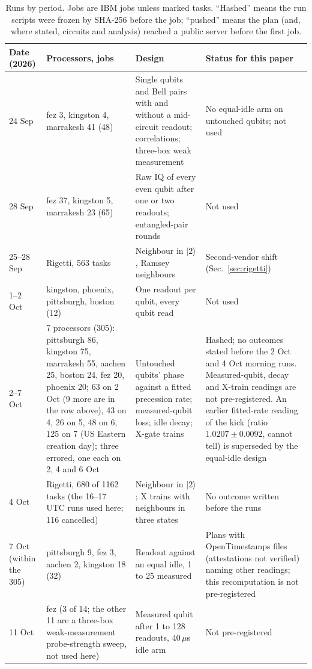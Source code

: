 \documentclass[reprint,amsmath,amssymb,aps,superscriptaddress,nofootinbib]{revtex4-2}
\newcommand{\us}{\,$\mu$s}
\begin{document}
\begin{table}[!tp]
\caption{Runs by period. Jobs are IBM jobs unless marked tasks. ``Hashed'' means the run scripts were frozen by SHA-256 before the job; ``pushed'' means the plan (and, where stated, circuits and analysis) reached a public server before the first job.}
\label{tab:runs}
\footnotesize
\begin{tabular}{p{2.3cm}p{3.6cm}p{6.3cm}p{4.9cm}}
\toprule
Date (2026) & Processors, jobs & Design & Status for this paper \\
\midrule
24 Sep & fez 3, kingston 4, marrakesh 41 (48) & Single qubits and Bell pairs with and without a mid-circuit readout; correlations; three-box weak measurement & No equal-idle arm on untouched qubits; not used \\
28 Sep & fez 37, kingston 5, marrakesh 23 (65) & Raw IQ of every even qubit after one or two readouts; entangled-pair rounds & Not used \\
25--28 Sep & Rigetti, 563 tasks & Neighbour in $|2\rangle$, Ramsey neighbours & Second-vendor shift (Sec.~\ref{sec:rigetti}) \\
1--2 Oct & kingston, phoenix, pittsburgh, boston (12) & One readout per qubit, every qubit read & Not used \\
2--7 Oct & 7 processors (305): pittsburgh 86, kingston 75, marrakesh 55, aachen 25, boston 24, fez 20, phoenix 20; 63 on 2 Oct (9 more are in the row above), 43 on 4, 26 on 5, 48 on 6, 125 on 7 (US Eastern creation day); three errored, one each on 2, 4 and 6 Oct & Untouched qubits' phase against a fitted precession rate; measured-qubit loss; idle decay; X-gate trains & Hashed; no outcomes stated before the 2 Oct and 4 Oct morning runs. Measured-qubit, decay and X-train readings are not pre-registered. An earlier fitted-rate reading of the kick (ratio $1.0207\pm0.0092$, cannot tell) is superseded by the equal-idle design \\
4 Oct & Rigetti, 680 of 1162 tasks (the 16--17 UTC runs used here; 116 cancelled) & Neighbour in $|2\rangle$; X trains with neighbours in three states & No outcome written before the runs \\
7 Oct (within the 305) & pittsburgh 9, fez 3, aachen 2, kingston 18 (32) & Readout against an equal idle, 1 to 25 measured & Plans with OpenTimestamps files (attestations not verified) naming other readings; this recomputation is not pre-registered \\
11 Oct & fez (3 of 14; the other 11 are a three-box weak-measurement probe-strength sweep, not used here) & Measured qubit after 1 to 128 readouts, 40\us{} idle arm & Not pre-registered \\

\end{tabular}
\end{table}
\end{document}
